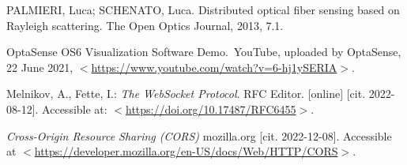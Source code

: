 \begin{thebibliography}{99}
PALMIERI, Luca; SCHENATO, Luca. Distributed optical fiber sensing based on Rayleigh scattering. The Open Optics Journal, 2013, 7.1.

OptaSense OS6 Visualization Software Demo. YouTube, uploaded by OptaSense, 22 June 2021, \(<\)\url{https://www.youtube.com/watch?v=6-hj1ySERIA}\(>\).

Melnikov, A., Fette, I.: \emph{The WebSocket Protocol}. RFC Editor. [online] [cit. 2022-08-12]. Accessible at: \(<\)\url{https://doi.org/10.17487/RFC6455}\(>\).

\emph{Cross-Origin Resource Sharing (CORS)} mozilla.org [cit. 2022-12-08]. Accessible at \(<\)\url{https://developer.mozilla.org/en-US/docs/Web/HTTP/CORS}\(>\).










\end{thebibliography}
